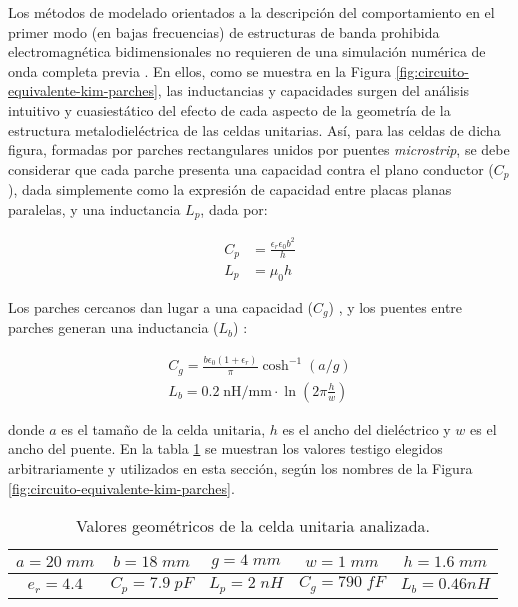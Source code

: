 Los métodos de modelado orientados a la descripción del comportamiento en el primer modo (en bajas frecuencias) de estructuras de banda prohibida electromagnética bidimensionales no requieren de una simulación numérica de onda completa previa \cite{KimSchuttAine:AnalysisHybrid}. En ellos, como se muestra en la Figura \ref{fig:circuito-equivalente-kim-parches}, las inductancias y capacidades surgen del análisis intuitivo y cuasiestático del efecto de cada aspecto de la geometría de la estructura metalodieléctrica de las celdas unitarias. Así, para las celdas de dicha figura, formadas por parches rectangulares unidos por puentes \textit{microstrip}, se debe considerar que cada parche presenta una capacidad contra el plano conductor ($C_p$), dada simplemente como la expresión de capacidad entre placas planas paralelas, y una inductancia $L_p$, dada por:

\begin{align}
\label{eq:Cp_Lp}
C_p &= \frac{\epsilon_r \epsilon_0 b^2}{h} \\
L_p &= \mu_0 h
\end{align}

Los parches cercanos dan lugar a una capacidad ($C_g$) \cite{Marcela:Tesis} \cite{Sievenpiper:Thesis} \cite{KimSchuttAine:AnalysisHybrid}, y los puentes entre parches generan una inductancia ($L_{b}$) \cite{KimSchuttAine:AnalysisHybrid}:

\begin{align}
\label{eq:cgap-y-lgap}
C_{g} = \frac{b \epsilon_0 (1+\epsilon_r)}{\pi} \cosh^{-1} (a / g) \\
L_{b} = 0.2\; \text{nH/mm} \cdot \ln (2\pi \frac{h}{w})
\end{align}

donde $a$ es el tamaño de la celda unitaria, $h$ es el ancho del dieléctrico y $w$ es el ancho del puente. En la tabla \ref{table:CeldaUnitariaFacil-AnalisisiCircuital} se muestran los valores testigo elegidos arbitrariamente y utilizados en esta sección, según los nombres de la Figura \ref{fig:circuito-equivalente-kim-parches}.

\begin{table}
	\centering
	\begin{tabular}{|c|c|c|c|c|}
		
		\hline
		$a = 20\;mm$ & $b = 18 \;mm$ & $g = 4 \;mm$ & $w = 1\;mm$ & $h = 1.6\;mm$ \\ 
		\hline
		$e_r = 4.4$ & $C_p = 7.9\;pF$ & $L_p = 2\;nH$ & $C_g = 790\; fF$ & $L_b = 0.46 nH$ \\ 
		\hline 
	\end{tabular}
	\caption{Valores geométricos de la celda unitaria analizada.}
	\label{table:CeldaUnitariaFacil-AnalisisiCircuital}
\end{table}



